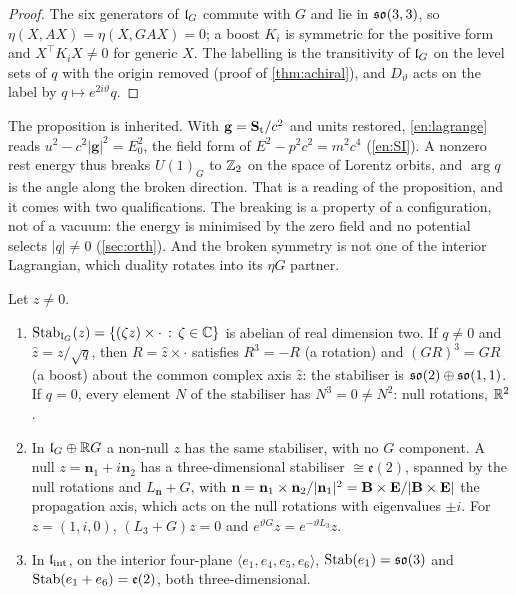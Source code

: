 \begin{proof}
The six generators of $\mathfrak l_G$ commute with $G$ and lie in $\mathfrak{so}(3,3)$, so $\eta(X,AX)=\eta(X,GAX)=0$; a boost $K_i$ is symmetric for the positive form
and $X^{\!\top}K_iX\neq0$ for generic $X$. The labelling is the transitivity of $\mathfrak l_G$ on the level sets of $q$ with the origin removed (proof of
\cref{thm:achiral}), and $D_\vartheta$ acts on the label by $q\mapsto e^{2i\vartheta}q$.
\end{proof}

The proposition is inherited. With $\mathbf g=\mathbf S_{\rm t}/c^2$ and units restored, \eqref{en:lagrange} reads $u^2-c^2|\mathbf g|^2=E_0^2$, the
field form of $E^2-p^2c^2=m^2c^4$ (\cref{en:SI}). A nonzero rest energy thus breaks $U(1)_G$ to $\mathbb{Z}_2$ on the space of Lorentz orbits, and $\arg q$ is the angle along the broken
direction. That is a
reading of the proposition, and it comes with two qualifications. The breaking is a property of a configuration, not of a vacuum: the energy is
minimised by the zero field and no potential selects $|q|\neq0$ (\cref{sec:orth}). And the broken symmetry is not one of the interior Lagrangian,
which duality rotates into its $\eta G$ partner.

\begin{theorem}
\label{en:stab}
Let $z\neq0$.
\begin{enumerate}[label=(\roman*),leftmargin=2.2em]
\item $\operatorname{Stab}_{\mathfrak l_G}(z)=\{(\zeta z)\times\cdot\,:\,\zeta\in\mathbb{C}\}$ is abelian of real dimension two. If $q\neq0$ and $\hat z=z/\sqrt q$, then
$R=\hat z\times\cdot$ satisfies $R^3=-R$ (a rotation) and $(GR)^3=GR$ (a boost) about the common complex axis $\hat z$: the stabiliser is
$\mathfrak{so}(2)\oplus\mathfrak{so}(1,1)$. If $q=0$, every element $N$ of the stabiliser has $N^3=0\neq N^2$: null rotations, $\mathbb{R}^2$.
\item In $\mathfrak l_G\oplus\mathbb{R} G$ a non-null $z$ has the same stabiliser, with no $G$ component. A null $z=\mathbf n_1+i\mathbf n_2$ has a three-dimensional
stabiliser $\cong\mathfrak e(2)$, spanned by the null rotations and $L_{\mathbf n}+G$, with $\mathbf n=\mathbf n_1\times\mathbf n_2/|\mathbf n_1|^2=\mathbf B\times\mathbf E/|\mathbf B\times\mathbf E|$
the propagation axis, which acts on the null rotations with eigenvalues $\pm i$. For $z=(1,i,0)$, $(L_3+G)z=0$ and $e^{\vartheta G}z=e^{-\vartheta L_3}z$.
\item In $\mathfrak l_{\rm int}$, on the interior four-plane $\langle e_1,e_4,e_5,e_6\rangle$, $\operatorname{Stab}(e_1)=\mathfrak{so}(3)$ and $\operatorname{Stab}(e_1+e_6)=\mathfrak e(2)$, both
three-dimensional.
\end{enumerate}
\end{theorem}


